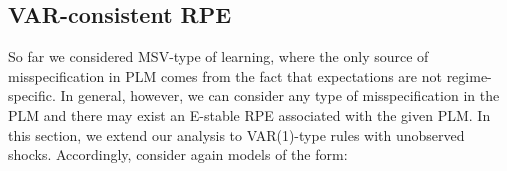 \documentclass[12pt,reqno]{article}
\numberwithin{equation}{section}
\begin{document}

\newpage



\subsection{VAR-consistent RPE} 

So far we considered MSV-type of learning, where the only source of misspecification in PLM comes from the fact that expectations are not regime-specific. In general, however, we can consider any type of misspecification in the PLM and there may exist an E-stable RPE associated with the given PLM. In this section, we extend our analysis to VAR(1)-type rules with unobserved shocks. 
Accordingly, consider again models of the form:
\end{document}
